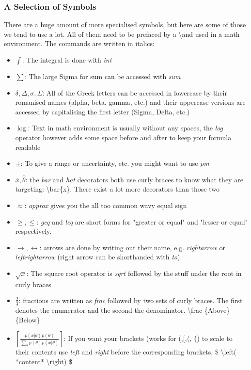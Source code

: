 \subsubsection{A Selection of Symbols}
There are a huge amount of more specialised symbols, but here are some of those we tend to use a lot. All of them need to be prefaced by a \textbackslash and used in a math environment. The commands are written in italics:
\begin{itemize}
    \item $\int$: The integral is done with \textit{int}
    \item $\sum$: The large Sigma for sum can be accessed with \textit{sum}
    \item $\delta, \Delta, \sigma, \Sigma$: All of the Greek letters can be accessed in lowercase by their romanised names (alpha, beta, gamma, etc.) and their uppercase versions are accessed by capitalising the first letter (Sigma, Delta, etc.)
    \item $\log$: Text in math environment is usually without any spaces, the \textit{log} operator however adds some space before and after to keep your formula readable
    \item $\pm$:  To give a range or uncertainty, etc. you might want to use \textit{pm}
    \item $\bar{x}, \hat{\theta}$: the \textit{bar} and \textit{hat} decorators both use curly braces to know what they are targeting: \textbackslash bar\{x\}. There exist a lot more decorators than those two
    \item $\approx$: \textit{approx} gives you the all too common wavy equal sign
    \item $\geq, \leq$: \textit{geq} and \textit{leq} are short forms for "greater or equal" and "lesser or equal" respectively.
    \item $\rightarrow, \leftrightarrow$: arrows are done by writing out their name, e.g. \textit{rightarrow} or \textit{leftrightarrow} (right arrow can be shorthanded with \textit{to})
    \item $\sqrt{x}$: The square root operator is \textit{sqrt} followed by the stuff under the root in curly braces
    \item $\frac{2}{3}$: fractions are written as \textit{frac} followed by two sets of curly braces. The first denotes the enumerator and the second the denominator. \textbackslash frac \{Above\}\{Below\}
    \item $\left[ \frac{p(x|\theta)p(\theta)}{\sum_\theta p(\theta)p(x|\theta)} \right]$: If you want your brackets (works for (,[,$\langle$, $\{$) to scale to their contents use \textit{left} and \textit{right} before the corresponding brackets, \$ \textbackslash left( *content* \textbackslash right) \$

\end{itemize}

